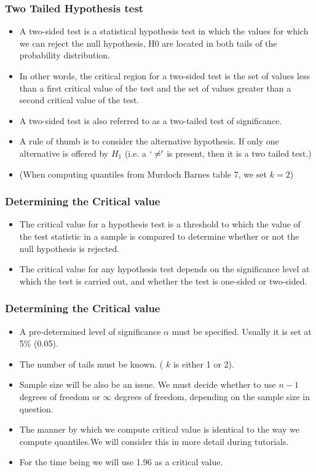 ﻿\documentclass[a4]{beamer}
\begin{document}
\begin{frame}
\frametitle{Two Tailed Hypothesis test}
\begin{itemize}
\item
A two-sided test is a statistical hypothesis test in which the values for which we can reject the null hypothesis, H0 are located in both tails of the probability distribution.

\item In other words, the critical region for a two-sided test is the set of values less than a first critical value of the test and the set of values greater than a second critical value of the test.

\item A two-sided test is also referred to as a two-tailed test of significance.
\item A rule of thumb is to consider the alternative hypothesis.  If only one alternative is offered by $H_1$ (i.e. a $`\neq'$ is present, then it is a two tailed test.)
\item (When computing quantiles from Murdoch Barnes table 7, we set $k=2$)

\end{itemize}
\end{frame}




\begin{frame}
\frametitle{Determining the Critical value}
\begin{itemize} \item The critical value for a hypothesis test is a threshold to which the value of the test statistic in a sample is compared to determine whether or not the null hypothesis is rejected.

\item The critical value for any hypothesis test depends on the significance level at which the test is carried out, and whether the test is one-sided or two-sided.
\end{itemize}
\end{frame}




\begin{frame}
\frametitle{Determining the Critical value}
\begin{itemize}
\item A pre-determined level of significance $\alpha$ must be specified. Usually it is set at 5\% (0.05).
\item The number of tails must be known. ( $k$ is either 1 or 2).
\item Sample size will be also be an issue. We must decide whether to use $n-1$ degrees of freedom or $\infty$ degrees of freedom, depending on the sample size in question.
\item The manner by which we compute critical value is identical to the way we compute quantiles.We will consider this in more detail during tutorials.
\item For the time being we will use 1.96 as a critical value.
\end{itemize}
\end{frame}
\end{document}
